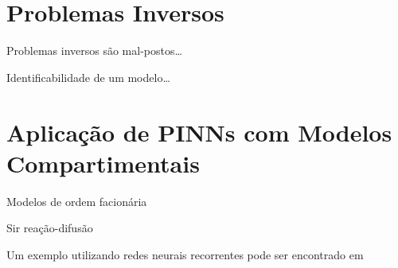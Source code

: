 \section{Problemas Inversos}

Problemas inversos são mal-postos\dots

Identificabilidade de um modelo\dots

\section{Aplicação de PINNs com Modelos Compartimentais}

\cite{}

Modelos de ordem facionária \cite{li-etal:25-ordem-fracionaria}

Sir reação-difusão \cite{bertaglia-etal:22-sir-reacao-difusao}

Um exemplo utilizando redes neurais recorrentes pode ser encontrado em \cite{rodriguez-etal:2022-einns}